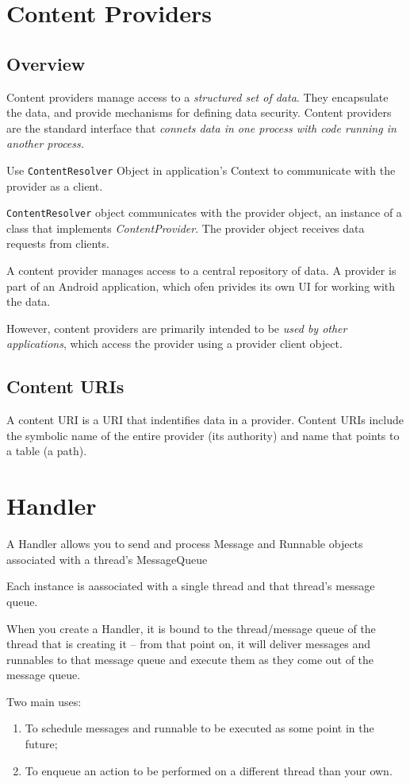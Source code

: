 \documentclass[11pt, a4paper]{book}
\begin{document}
\section{Content Providers}
\subsection{Overview}
Content providers manage access to a \emph{structured set of data}. They
encapsulate the data, and provide mechanisms for defining data security. Content
providers are the standard interface that \emph{connets data in one process with
code running in another process.}

Use \verb|ContentResolver| Object in application's Context to communicate with
the provider as a client. 

\verb|ContentResolver| object communicates with the provider object, an instance
of a class that implements \emph{ContentProvider}. The provider object receives
data requests from clients. 

A content provider manages access to a central repository of data. A provider is
part of an Android application, which ofen privides its own UI for working with
the data. 

However, content providers are primarily intended to be \emph{used by other
applications}, which access the provider using a provider client object. 

\subsection{Content URIs}
A content URI is a URI that indentifies data in a provider. Content URIs include
the symbolic name of the entire provider (its authority) and name that points to
a table (a path).
\section{Handler}
A Handler allows you to send and process Message and Runnable objects associated
with a thread's MessageQueue

Each instance is aassociated with a single thread and that thread's message
queue.

When you create a Handler, it is bound to the thread/message queue of the thread
that is creating it -- from that point on, it will deliver messages and
runnables to that message queue and execute them as they come out of the message
queue. 

Two main uses:
\begin{enumerate}
\item To schedule messages and runnable to be executed as some point in the
future;
\item To enqueue an action to be performed on a different thread than your own.
\end{enumerate}
\end{document}

